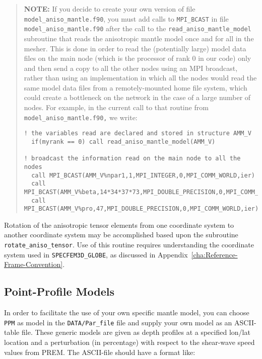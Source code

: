 \begin{quote}
\textbf{NOTE:} If you decide to create your own version of file \texttt{model\_aniso\_mantle.f90},
you must add calls to \texttt{MPI\_BCAST} in file \texttt{model\_aniso\_mantle.f90}
after the call to the \texttt{read\_aniso\_mantle\_model} subroutine
that reads the anisotropic mantle model once and for all in the mesher.
This is done in order to read the (potentially large) model data files
on the main node (which is the processor of rank 0 in our code)
only and then send a copy to all the other nodes using an MPI broadcast,
rather than using an implementation in which all the nodes would read
the same model data files from a remotely-mounted home file system,
which could create a bottleneck on the network in the case of a large
number of nodes. For example, in the current call to that routine
from \texttt{model\_aniso\_mantle.f90,} we write:

{\footnotesize
\begin{verbatim}
! the variables read are declared and stored in structure AMM_V
  if(myrank == 0) call read_aniso_mantle_model(AMM_V)

! broadcast the information read on the main node to all the nodes
  call MPI_BCAST(AMM_V%npar1,1,MPI_INTEGER,0,MPI_COMM_WORLD,ier)
  call MPI_BCAST(AMM_V%beta,14*34*37*73,MPI_DOUBLE_PRECISION,0,MPI_COMM_WORLD,ier)
  call MPI_BCAST(AMM_V%pro,47,MPI_DOUBLE_PRECISION,0,MPI_COMM_WORLD,ier)
\end{verbatim}
}
\end{quote}

Rotation of the anisotropic tensor elements from one coordinate system
to another coordinate system may be accomplished based upon the subroutine
\texttt{rotate\_aniso\_tensor}. Use of this routine requires understanding
the coordinate system used in \texttt{SPECFEM3D\_GLOBE}, as discussed
in Appendix~\ref{cha:Reference-Frame-Convention}.


\subsection{Point-Profile Models}\label{sub:Point-Profile-Models}

In order to facilitate the use of your own specific mantle model, you can choose \texttt{PPM} as model in the \texttt{DATA/Par\_file} file
and supply your own model as an ASCII-table file. These generic models are given as depth profiles at a specified lon/lat location
and a perturbation (in percentage) with respect to the shear-wave speed values from PREM. The ASCII-file should have a format like:


